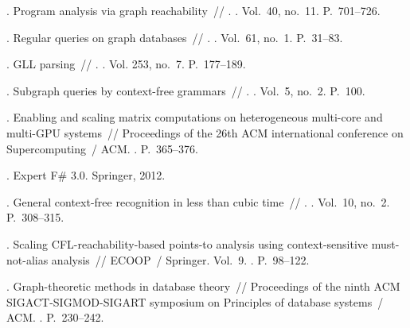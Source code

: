 \begin{thebibliography}{10}
. Program analysis via graph reachability~//
  . \BibDash
{}. \BibDash
\newblock Vol.~40, no.~11. \BibDash
\newblock P.~701--726.

. Regular queries on
  graph databases~// . \BibDash
{}. \BibDash
\newblock Vol.~61, no.~1. \BibDash
\newblock P.~31--83.

. GLL parsing~// . \BibDash
{}. \BibDash
\newblock Vol. 253, no.~7. \BibDash
\newblock P.~177--189.

. Subgraph queries by context-free
  grammars~// . \BibDash
{}. \BibDash
\newblock Vol.~5, no.~2. \BibDash
\newblock P.~100.

. Enabling and scaling
  matrix computations on heterogeneous multi-core and multi-GPU systems~//
  Proceedings of the 26th ACM international conference on Supercomputing~/ ACM.
  \BibDash
{}. \BibDash
\newblock P.~365--376.

. Expert F\# 3.0. \BibDash
\newblock Springer, 2012.

. General context-free recognition in less than cubic
  time~// . \BibDash
{}. \BibDash
\newblock Vol.~10, no.~2. \BibDash
\newblock P.~308--315.

. Scaling
  CFL-reachability-based points-to analysis using context-sensitive
  must-not-alias analysis~// ECOOP~/ Springer. \BibDash
\newblock Vol.~9. \BibDash
{}. \BibDash
\newblock P.~98--122.

. Graph-theoretic methods in database theory~//
  Proceedings of the ninth ACM SIGACT-SIGMOD-SIGART symposium on Principles of
  database systems~/ ACM. \BibDash
{}. \BibDash
\newblock P.~230--242.


\end{thebibliography}
